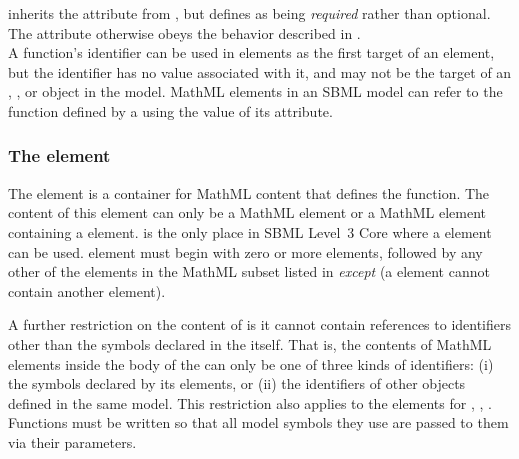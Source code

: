 {\FunctionDefinition inherits the  attribute from \SBase, but defines  as being \emph{required} rather than optional.  The  attribute otherwise obeys the behavior described in .\vspace*{1ex}
\\
A function's identifier can be used in  elements as the first target of an  element, but the identifier has no value associated with it, and may not be the target of an \InitialAssignment, \EventAssignment, or \Rule object in the model.}
MathML  elements in an SBML model can refer to the function defined by a \FunctionDefinition using the value of its  attribute.

\subsubsection{The  element}
\label{sec:function-definition-math}

The  element is a container for MathML content that
defines the function.  The content of this element can only be a
MathML  element or a MathML 
element containing a  element.  \FunctionDefinition
is the only place in SBML Level~3 Core where a 
element can be used.    element must begin with
zero or more  elements, followed by any other of the
elements in the MathML subset listed in
 \emph{except}  (\ie a
 element cannot contain another 
element).

A further restriction on the content of  is it cannot
contain references to identifiers other than the
symbols declared in the  itself.  That
is, the contents of MathML  elements inside the body of
the  can only be one of three kinds of
  identifiers: (i) the symbols declared by its 
  elements, or (ii) the identifiers of other
\FunctionDefinition objects defined in the same model.
This
restriction also applies to the  elements for
, ,  .
Functions must be written so that all model symbols they use are
passed to them via their parameters.

